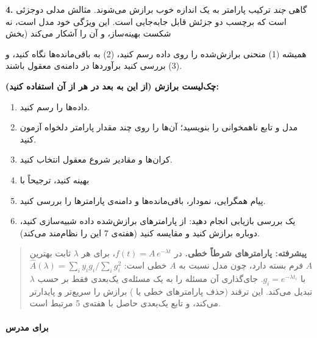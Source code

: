 \textbf{4. } گاهی \emph{چند} ترکیب پارامتر به
یک اندازه خوب برازش می‌شوند. مثالش مدلی دوجزئی است که برچسب دو جزئش قابل
جابه‌جایی است. این ویژگی خود مدل است، نه شکست بهینه‌ساز، و
 آن را آشکار می‌کند (بخش 

همیشه (1) منحنی برازش‌شده را روی داده رسم کنید، (2) به باقی‌مانده‌ها نگاه
کنید، و (3) بررسی کنید برآوردها در دامنه‌ی معقول باشند.

\textbf{چک‌لیست برازش (از این به بعد در هر  از آن استفاده کنید):}

\begin{enumerate}
\def\labelenumi{\arabic{enumi}.}
\tightlist
\item
  داده‌ها را رسم کنید.
\item
  مدل و تابع ناهمخوانی را بنویسید؛ آن‌ها را روی چند مقدار پارامتر دلخواه
  آزمون کنید.
\item
  کران‌ها و مقادیر شروع معقول انتخاب کنید.
\item
  بهینه کنید، ترجیحاً با 
\item
  پیام همگرایی، نمودار، باقی‌مانده‌ها و دامنه‌ی پارامترها را بررسی کنید.
\item
  یک بررسی بازیابی انجام دهید: از پارامترهای برازش‌شده داده شبیه‌سازی
  کنید، دوباره برازش کنید و مقایسه کنید (هفته‌ی 7 این را نظام‌مند می‌کند).
\end{enumerate}

\begin{quote}
\textbf{پیشرفته: پارامترهای شرطاً خطی.} در \(f(t) = A\,e^{-\lambda t}\)،
برای هر \(\lambda\) ثابت بهترین \(A\) فرم بسته دارد، چون مدل نسبت به
\(A\) خطی است: \(\hat A(\lambda) = \sum_i y_i g_i / \sum_i g_i^2\) با
\(g_i = e^{-\lambda t_i}\). جای‌گذاری آن مسئله را به یک مسئله‌ی یک‌بعدی فقط
بر حسب \(\lambda\) تبدیل می‌کند. این ترفند (حذف پارامترهای خطی یا
\emph{}) برازش را سریع‌تر و پایدارتر می‌کند، و
تابع یک‌بعدی حاصل با \emph{} هفته‌ی 5 مرتبط است.
\end{quote}

\paragraph{برای مدرس}

